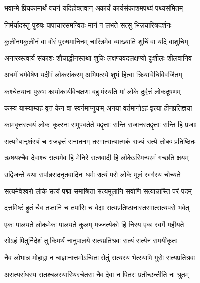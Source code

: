 \twolineshloka
{भवान्मे प्रियकामार्थं वचनं यदिहोक्तवान्}
{अकार्यं कार्यसंकाशमपथ्यं पथ्यसंमितम्} %

\twolineshloka
{निर्मर्यादस्तु पुरुषः पापाचारसमन्वितः}
{मानं न लभते सत्सु भिन्नचारित्रदर्शनः} %

\twolineshloka
{कुलीनमकुलीनं वा वीरं पुरुषमानिनम्}
{चारित्रमेव व्याख्याति शुचिं वा यदि वाशुचिम्} %

\twolineshloka
{अनारय्स्त्वार्य संकाशः शौचाद्धीनस्तथा शुचिः}
{लक्षण्यवदलक्षण्यो दुःशीलः शीलवानिव} %

\twolineshloka
{अधर्मं धर्मवेषेण यदीमं लोकसंकरम्}
{अभिपत्स्ये शुभं हित्वा क्रियाविधिविवर्जितम्} %

\twolineshloka
{कश्चेतयानः पुरुषः कार्याकार्यविचक्षणः}
{बहु मंस्यति मां लोके दुर्वृत्तं लोकदूषणम्} %

\twolineshloka
{कस्य यास्याम्यहं वृत्तं केन वा स्वर्गमाप्नुयाम्}
{अनया वर्तमानोऽहं वृत्त्या हीनप्रतिज्ञया} %

\twolineshloka
{कामवृत्तस्त्वयं लोकः कृत्स्नः समुपवर्तते}
{यद्वृत्ताः सन्ति राजानस्तद्वृत्ताः सन्ति हि प्रजाः} %

\twolineshloka
{सत्यमेवानृशंस्यं च राजवृत्तं सनातनम्}
{तस्मात्सत्यात्मकं राज्यं सत्ये लोकः प्रतिष्ठितः} %

\twolineshloka
{ऋषयश्चैव देवाश्च सत्यमेव हि मेनिरे}
{सत्यवादी हि लोकेऽस्मिन्परमं गच्छति क्षयम्} %

\twolineshloka
{उद्विजन्ते यथा सर्पान्नरादनृतवादिनः}
{धर्मः सत्यं परो लोके मूलं स्वर्गस्य चोच्यते} %

\twolineshloka
{सत्यमेवेश्वरो लोके सत्यं पद्मा समाश्रिता}
{सत्यमूलानि सर्वाणि सत्यान्नास्ति परं पदम्} %

\twolineshloka
{दत्तमिष्टं हुतं चैव तप्तानि च तपांसि च}
{वेदाः सत्यप्रतिष्ठानास्तस्मात्सत्यपरो भवेत्} %

\twolineshloka
{एकः पालयते लोकमेकः पालयते कुलम्}
{मज्जत्येको हि निरय एकः स्वर्गे महीयते} %

\twolineshloka
{सोऽहं पितुर्निदेशं तु किमर्थं नानुपालये}
{सत्यप्रतिश्रवः सत्यं सत्येन समयीकृतः} %

\twolineshloka
{नैव लोभान्न मोहाद्वा न चाज्ञानात्तमोऽन्वितः}
{सेतुं सत्यस्य भेत्स्यामि गुरोः सत्यप्रतिश्रवः} %

\twolineshloka
{असत्यसंधस्य सतश्चलस्यास्थिरचेतसः}
{नैव देवा न पितरः प्रतीच्छन्तीति नः श्रुतम्} %

